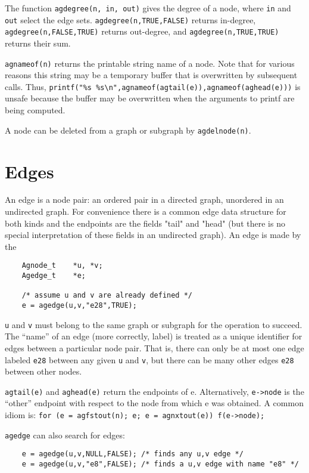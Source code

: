 \documentclass[11pt,letterpaper]{article}
\begin{document}
The function \verb"agdegree(n, in, out)" gives the degree
of a node, where \verb"in" and \verb"out" select the edge sets.
\verb"agdegree(n,TRUE,FALSE)" returns in-degree,
\verb"agdegree(n,FALSE,TRUE)" returns out-degree,
and \verb"agdegree(n,TRUE,TRUE)" returns their sum.

\verb"agnameof(n)" returns the printable string name of a node.
Note that for various reasons this string may be a temporary
buffer that is overwritten by subsequent calls.
Thus, \verb'printf("%s %s\n",agnameof(agtail(e)),agnameof(aghead(e)))'
is unsafe because the buffer may be overwritten when the
arguments to printf are being computed.

A node can be deleted from a graph or subgraph by \verb"agdelnode(n)".



\section{Edges}
\label{sec:edges}
An edge is a node pair: an ordered pair in a directed graph,
unordered in an undirected graph.  For convenience there is
a common edge data structure for both kinds and the endpoints
are the fields "tail" and "head" (but there is no special
interpretation of these fields in an undirected graph).
An edge is made by the 

\begin{verbatim}
    Agnode_t    *u, *v;
    Agedge_t    *e;
    
    /* assume u and v are already defined */
    e = agedge(u,v,"e28",TRUE);

\end{verbatim}

\verb"u" and \verb"v" must belong to the same graph or subgraph
for the operation to succeed.  The ``name'' of an edge
(more correctly, label) is treated as a unique identifier for edges
between a particular node pair.  That is, there can only be at most
one edge labeled \verb"e28" between any given \verb"u" and \verb"v",
but there can be many other edges \verb"e28" between other nodes.

\verb"agtail(e)" and \verb"aghead(e)" return the endpoints of e.
Alternatively, \verb"e->node" is the ``other'' endpoint
with respect to the node from which e was obtained.
A common idiom is: {\tt for (e = agfstout(n); e; e = agnxtout(e)) f(e->node);}

\verb"agedge" can also search for edges:

\begin{verbatim}
    e = agedge(u,v,NULL,FALSE); /* finds any u,v edge */
    e = agedge(u,v,"e8",FALSE); /* finds a u,v edge with name "e8" */
\end{verbatim}
\end{document}
